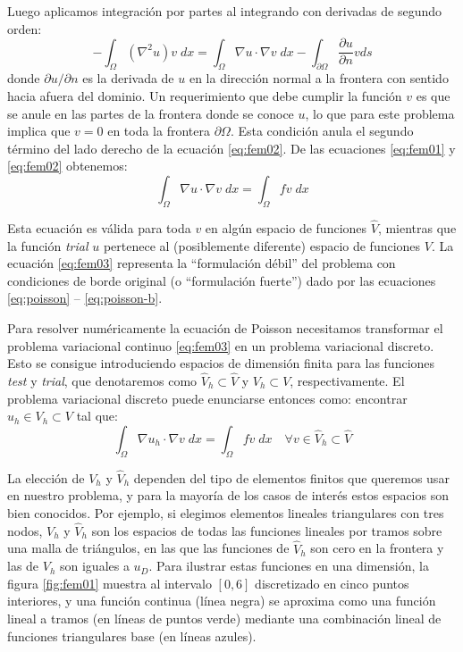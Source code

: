 Luego aplicamos integración por partes al integrando con derivadas de segundo orden:
\begin{equation}\label{eq:fem02}
 -\int_{\Omega} (\nabla^2 u) v \; dx = \int_{\Omega} \nabla u \cdot \nabla v \; dx - \int_{\partial \Omega} \frac{\partial u}{\partial n} v ds
\end{equation} 
donde $\partial u / \partial n$ es la derivada de $u$ en la dirección normal a la frontera con sentido hacia afuera del dominio. Un requerimiento que debe cumplir la función $v$ es que se anule en las partes de la frontera donde se conoce $u$, lo que para este problema implica que $v=0$ en toda la frontera $\partial \Omega$. Esta condición anula el segundo término del lado derecho de la ecuación \eqref{eq:fem02}. De las ecuaciones \eqref{eq:fem01} y \eqref{eq:fem02} obtenemos:
\begin{equation}\label{eq:fem03}
 \int_{\Omega} \nabla u \cdot \nabla v \; dx = \int_{\Omega} f v \; dx
\end{equation} 

Esta ecuación es válida para toda $v$ en algún espacio de funciones $\hat{V}$, mientras que la función \textit{trial} $u$ pertenece al (posiblemente diferente) espacio de funciones $V$. La ecuación \eqref{eq:fem03} representa la ``formulación débil'' del problema con condiciones de borde original (o ``formulación fuerte'') dado por las ecuaciones \eqref{eq:poisson} -- \eqref{eq:poisson-b}.

Para resolver numéricamente la ecuación de Poisson necesitamos transformar el problema variacional continuo \eqref{eq:fem03} en un problema variacional discreto. Esto se consigue introduciendo espacios de dimensión finita para las funciones \textit{test} y \textit{trial}, que denotaremos como $\hat{V}_h \subset \hat{V}$ y $V_h \subset V$, respectivamente. El problema variacional discreto puede enunciarse entonces como: encontrar $u_h \in V_h \subset V$ tal que:
\begin{equation} \label{eq:fem04}
 \int_{\Omega} \nabla u_h \cdot \nabla v \; dx = \int_{\Omega} f v \; dx \quad \forall v \in \hat{V}_h \subset \hat{V}
\end{equation} 

La elección de $V_h$ y $\hat{V}_h$ dependen del tipo de elementos finitos que queremos usar en nuestro problema, y para la mayoría de los casos de interés estos espacios son bien conocidos. Por ejemplo, si elegimos elementos lineales triangulares con tres nodos, $V_h$ y $\hat{V}_h$ son los espacios de todas las funciones lineales por tramos sobre una malla de triángulos, en las que las funciones de $\hat{V}_h$ son cero en la frontera y las de $V_h$ son iguales a $u_D$. Para ilustrar estas funciones en una dimensión, la figura \ref{fig:fem01} muestra al intervalo $[0, 6]$ discretizado en cinco puntos interiores, y una función continua (línea negra) se aproxima como una función lineal a tramos (en líneas de puntos verde) mediante una combinación lineal de funciones triangulares base (en líneas azules).

